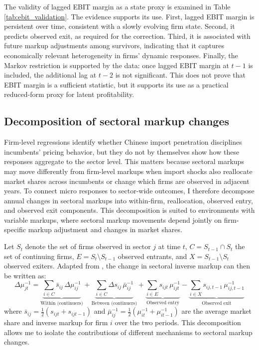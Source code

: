 \documentclass[12pt]{article}
\begin{document}
The validity of lagged EBIT margin as a state proxy is examined in Table \ref{tab:ebit_validation}. The evidence supports its use. First, lagged EBIT margin is persistent over time, consistent with a slowly evolving firm state. Second, it predicts observed exit, as required for the correction. Third, it is associated with future markup adjustments among survivors, indicating that it captures economically relevant heterogeneity in firms' dynamic responses. Finally, the Markov restriction is supported by the data: once lagged EBIT margin at $t-1$ is included, the additional lag at $t-2$ is not significant. This does not prove that EBIT margin is a sufficient statistic, but it supports its use as a practical reduced-form proxy for latent profitability.

\subsection{Decomposition of sectoral markup changes}

Firm-level regressions identify whether Chinese import penetration disciplines incumbents' pricing behavior, but they do not by themselves show how these responses aggregate to the sector level. This matters because sectoral markups may move differently from firm-level markups when import shocks also reallocate market shares across incumbents or change which firms are observed in adjacent years. To connect micro responses to sector-wide outcomes, I therefore decompose annual changes in sectoral markups into within-firm, reallocation, observed entry, and observed exit components. This decomposition is suited to environments with variable markups, where sectoral markup movements depend jointly on firm-specific markup adjustment and changes in market shares. 

Let $S_t$ denote the set of firms observed in sector $j$ at time $t$, $C = S_{t-1} \cap S_t$ the set of continuing firms, $E = S_t \setminus S_{t-1}$ observed entrants, and $X = S_{t-1} \setminus S_t$ observed exiters. Adapted from \textcite{melitzDynamicOlleyPakesProductivity2015}, the change in sectoral inverse markup can then be written as:
\[\Delta \mu_{jt}^{-1}
=
\underbrace{\sum_{i \in C} \bar{s}_{ij}\,\Delta \mu_{ij}^{-1}}_{\text{Within (continuers)}}
+
\underbrace{\sum_{i \in C} \Delta s_{ij}\,\bar{\mu}_{ij}^{-1}}_{\text{Between (continuers)}}
+
\underbrace{\sum_{i \in E} s_{ijt}\,\mu_{ijt}^{-1}}_{\text{Observed entry}} - \underbrace{\sum_{i \in X} s_{ij,t-1}\,\mu_{ij,t-1}^{-1}}_{\text{Observed exit}}\]
where $\bar{s}_{ij} = \frac{1}{2}(s_{ijt} + s_{ijt-1})$ and $\bar{\mu}_{ij}^{-1} = \frac{1}{2}(\mu_{it}^{-1} + \mu_{it-1}^{-1})$ are the average market share and inverse markup for firm $i$ over the two periods. This decomposition allows me to isolate the contributions of different mechanisms to sectoral markup changes.
\end{document}

